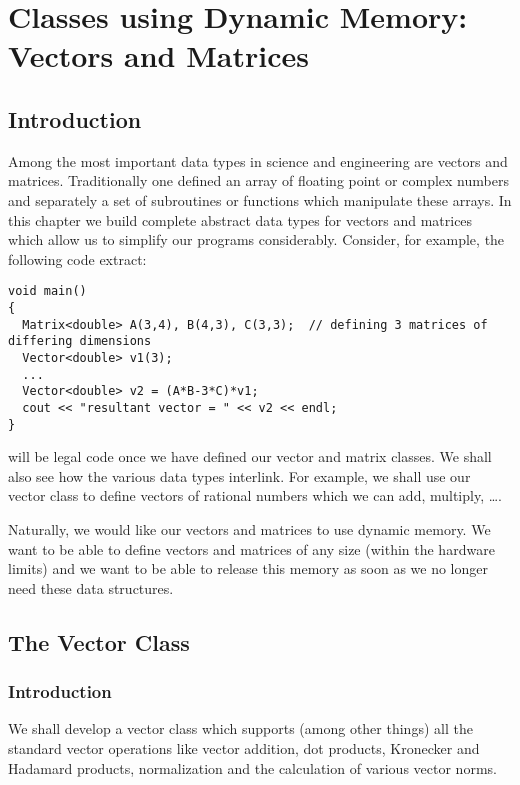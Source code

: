 \chapter{Classes using Dynamic Memory: Vectors and Matrices 
             \label{chapVecmat}}

\section{Introduction}

Among the most important data types in science and engineering are
vectors and matrices. Traditionally one defined an array of floating
point or complex numbers and separately a set of subroutines or 
functions which manipulate these arrays. In this chapter we build 
complete abstract data types for vectors and matrices which allow
us to simplify our programs considerably. Consider, for example,
the following code extract:
{\footnotesize \begin{verbatim}
void main()
{
  Matrix<double> A(3,4), B(4,3), C(3,3);  // defining 3 matrices of differing dimensions
  Vector<double> v1(3);
  ...
  Vector<double> v2 = (A*B-3*C)*v1;
  cout << "resultant vector = " << v2 << endl;
}
\end{verbatim}}
will be legal code once we have defined our vector and matrix classes.
We shall also see how the various data types interlink. For example,
we shall use our vector class to define vectors of rational numbers
which we can add, multiply, \dots.

Naturally, we would like our vectors and matrices to use dynamic memory. 
We want to be able to define vectors and matrices of any size (within the
hardware limits) and we want to be able to release this memory as
soon as we no longer need these data structures. 


\section{The Vector Class}

\subsection{Introduction}
We shall develop a vector class which supports (among other things)
all the standard vector operations like vector addition, dot products, 
Kronecker and Hadamard products, normalization and the calculation 
of various vector norms.

